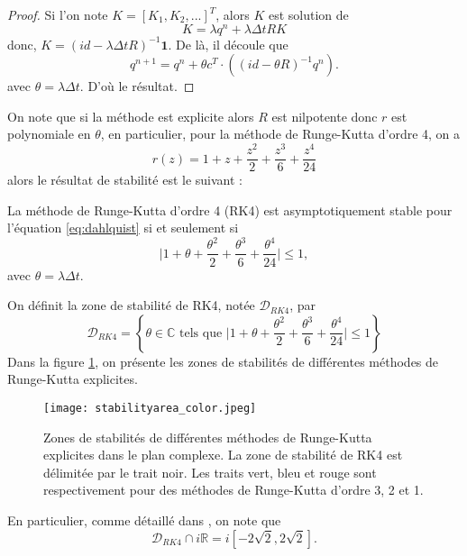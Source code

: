 \begin{proof}
Si l'on note $K = [K_1, K_2, ...]^T$, alors $K$ est solution de 
\begin{equation}
K = \lambda q^n +  \lambda \Delta t R K
\end{equation}
donc, $K = (id - \lambda \Delta t R)^{-1} \mathbf{1}$.
De là, il découle que 
\begin{equation}
q^{n+1} = q^n + \theta c^T \cdot \left( (id - \theta R)^{-1} q^n \right).
\end{equation} 
avec $\theta = \lambda \Delta t$. D'où le résultat.
\end{proof}
On note que si la méthode est explicite alors $R$ est nilpotente donc $r$ est polynomiale en $\theta$, 
en particulier, pour la méthode de Runge-Kutta d'ordre 4, on a 
\begin{equation}
r(z) = 1 + z + \dfrac{z^2}{2} + \dfrac{z^3}{6} + \dfrac{z^4}{24} 
\end{equation}
alors le résultat de stabilité est le suivant :
\begin{proposition}
La méthode de Runge-Kutta d'ordre 4 (RK4) est asymptotiquement stable pour l'équation \eqref{eq:dahlquist} si et seulement si
\begin{equation}
\vert 1 + \theta + \dfrac{\theta^2}{2} + \dfrac{\theta^3}{6} + \dfrac{\theta^4}{24}  \vert \leq 1,
\end{equation}
avec $\theta = \lambda \Delta t$.
\label{prop:stab_rk4}
\end{proposition}
On définit la zone de stabilité de RK4, notée $\mathcal{D}_{RK4}$, par
\begin{equation}
\mathcal{D}_{RK4} = \left\lbrace \theta \in \mathbb{C} \text{ tels que } \vert 1 + \theta + \dfrac{\theta^2}{2} + \dfrac{\theta^3}{6} + \dfrac{\theta^4}{24}  \vert \leq 1 \right\rbrace
\end{equation} 
Dans la figure \ref{fig:stab_area}, on présente les zones de stabilités de différentes méthodes de Runge-Kutta explicites.
\begin{figure}[htbp]
\begin{center}
\texttt{[image: stabilityarea\_color.jpeg]}
\end{center}
\caption{Zones de stabilités de différentes méthodes de Runge-Kutta explicites dans le plan complexe. La zone de stabilité de RK4 est délimitée par le trait noir. Les traits vert, bleu et rouge sont respectivement pour des méthodes de Runge-Kutta d'ordre 3, 2 et 1.}
\label{fig:stab_area}
\end{figure}
En particulier, comme détaillé dans \cite{Hundsdorfer2013}, on note que
\begin{equation}
\mathcal{D}_{RK4} \cap i \mathbb{R} = i \left[-2 \sqrt{2},2 \sqrt{2}\right].
\end{equation}

